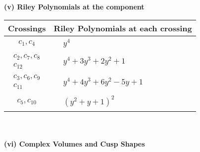 \documentclass[1p]{elsarticle_modified}
\theoremstyle{definition}
\begin{document}
\newpage\renewcommand{\arraystretch}{1}
\flushleft \textbf{(v) Riley Polynomials at the component}\newline \\
\begin{tabular}{m{50pt}|m{274pt}}
Crossings & \hspace{64pt}Riley Polynomials at each crossing \\
\hline $$\begin{aligned}c_{1},c_{4}\end{aligned}$$&$\begin{aligned}
&y^4
\end{aligned}$\\
\hline $$\begin{aligned}c_{2},c_{7},c_{8}\\c_{12}\end{aligned}$$&$\begin{aligned}
&y^4+3 y^3+2 y^2+1
\end{aligned}$\\
\hline $$\begin{aligned}c_{3},c_{6},c_{9}\\c_{11}\end{aligned}$$&$\begin{aligned}
&y^4+4 y^3+6 y^2-5 y+1
\end{aligned}$\\
\hline $$\begin{aligned}c_{5},c_{10}\end{aligned}$$&$\begin{aligned}
&(y^2+y+1)^2
\end{aligned}$\\
\hline
\end{tabular}\\~\\
\newpage\flushleft \textbf{(vi) Complex Volumes and Cusp Shapes}
\end{document}
